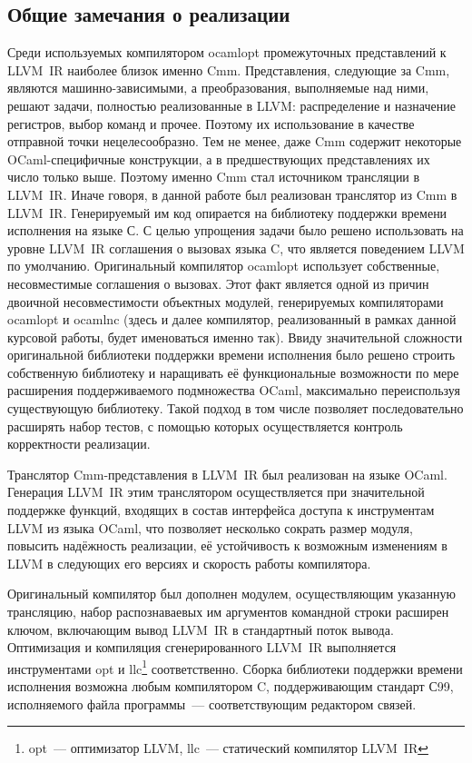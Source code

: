 \documentclass[a4paper, 12pt]{article}
\begin{document}
\subsection{Общие замечания о реализации}
Среди используемых компилятором ocamlopt промежуточных представлений к LLVM~IR наиболее близок именно Cmm.
Представления, следующие за Cmm, являются машинно-зависимыми, а преобразования, выполняемые над ними, решают задачи,
полностью реализованные в LLVM: распределение и назначение регистров, выбор команд и прочее. Поэтому их использование
в качестве отправной точки нецелесообразно. Тем не менее, даже Cmm содержит некоторые OCaml-специфичные конструкции,
а в предшествующих представлениях их число только выше. Поэтому именно Cmm стал источником
трансляции в LLVM~IR. Иначе говоря, в данной работе был реализован транслятор из Cmm в LLVM~IR. Генерируемый им код
опирается на библиотеку поддержки времени исполнения на языке С. С целью упрощения задачи было решено использовать
на уровне LLVM~IR соглашения о вызовах языка C, что является поведением LLVM по умолчанию. Оригинальный компилятор
ocamlopt использует собственные, несовместимые соглашения о вызовах. Этот факт является одной из причин двоичной
несовместимости объектных модулей, генерируемых компиляторами ocamlopt и ocamlnc (здесь и далее компилятор,
реализованный в рамках данной курсовой работы, будет именоваться именно так). Ввиду значительной сложности
оригинальной библиотеки поддержки времени исполнения было решено строить собственную библиотеку и наращивать её
функциональные возможности по мере расширения поддерживаемого подмножества OCaml, максимально переиспользуя существующую
библиотеку. Такой подход в том числе позволяет последовательно расширять набор тестов, с помощью которых осуществляется
контроль корректности реализации.

Транслятор Cmm-представления в LLVM~IR был реализован на языке OCaml. Генерация LLVM~IR этим транслятором осуществляется
при значительной поддержке функций, входящих в состав интерфейса доступа к инструментам LLVM из языка OCaml, что
позволяет несколько сократь размер модуля, повысить надёжность реализации, её устойчивость к возможным изменениям в
LLVM в следующих его версиях и скорость работы компилятора.

Оригинальный компилятор был дополнен модулем, осуществляющим указанную трансляцию, набор распознаваевых им аргументов
командной строки расширен ключом, включающим вывод LLVM~IR в стандартный поток вывода. Оптимизация и компиляция
сгенерированного LLVM~IR выполняется инструментами opt и llc\footnote{opt~--- оптимизатор LLVM, llc~--- статический
компилятор LLVM~IR} соответственно. Сборка библиотеки поддержки времени исполнения возможна любым компилятором C,
поддерживающим стандарт С99, исполняемого файла программы~--- соответствующим редактором связей.
\end{document}
